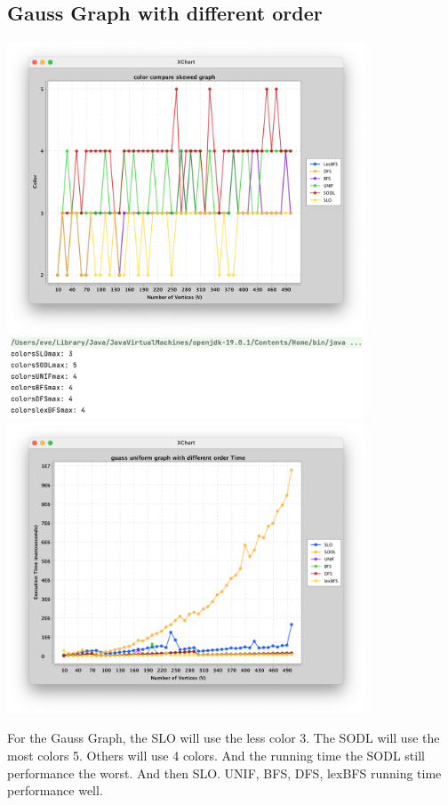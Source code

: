\documentclass{article}
\begin{document}
\subsection{Gauss Graph with different order}
    \begin{center}
            \includegraphics[width=0.8\textwidth]{2_7.png}
            \includegraphics[width=0.8\textwidth]{2_8.png}
            \includegraphics[width=0.8\textwidth]{2t5.png}
    \end{center}
        For the Gauss Graph, the SLO will use the less color 3. The SODL will use the most colors 5. Others will use 4 colors. And the running time the SODL still performance the worst. And then SLO. UNIF, BFS, DFS, lexBFS running time performance well.
\end{document}
